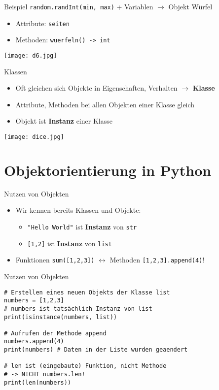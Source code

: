 \begin{frame}{Beispiel}
    \texttt{random.randInt(min, max)} + Variablen $\rightarrow$ Objekt \glqq Würfel\grqq \begin{itemize}
        \item Attribute: \texttt{seiten}
        \item Methoden: \texttt{wuerfeln() -> int}
    \end{itemize}
    \begin{center}
        \texttt{[image: d6.jpg]}
    \end{center}
\end{frame}
\begin{frame}{Klassen}
    \begin{itemize}
        \item Oft gleichen sich Objekte in Eigenschaften, Verhalten $\rightarrow$ \textbf{Klasse}
        \item Attribute, Methoden bei allen Objekten einer Klasse gleich
        \item Objekt ist \textbf{Instanz} einer Klasse
    \end{itemize}
    \texttt{[image: dice.jpg]}
\end{frame}


\section{Objektorientierung in Python}
\begin{frame}{Nutzen von Objekten}
    \begin{itemize}
        \item Wir kennen bereits Klassen und Objekte:
        \begin{itemize}
            \item \texttt{"Hello World"} ist \textbf{Instanz} von \texttt{str}
            \item \texttt{[1,2]} ist \textbf{Instanz} von \texttt{list}
        \end{itemize}
        \item Funktionen \texttt{sum([1,2,3])} $\leftrightarrow$ Methoden \texttt{[1,2,3].append(4)}!
    \end{itemize} 
\end{frame}

\begin{frame}[fragile]{Nutzen von Objekten}
\begin{lstlisting}
# Erstellen eines neuen Objekts der Klasse list
numbers = [1,2,3]
# numbers ist tatsächlich Instanz von list
print(isinstance(numbers, list))

# Aufrufen der Methode append
numbers.append(4)
print(numbers) # Daten in der Liste wurden geaendert

# len ist (eingebaute) Funktion, nicht Methode
# -> NICHT numbers.len!
print(len(numbers))
\end{lstlisting}
\end{frame}

